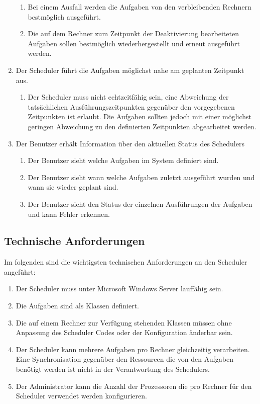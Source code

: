 \begin{enumerate}
\begin{enumerate}
		\item Bei einem Ausfall werden die Aufgaben von den verbleibenden Rechnern bestmöglich ausgeführt.
		\item Die auf dem Rechner zum Zeitpunkt der Deaktivierung bearbeiteten Aufgaben sollen bestmöglich wiederhergestellt und erneut ausgeführt werden.
	\end{enumerate}
	\item Der Scheduler führt die Aufgaben möglichst nahe am geplanten Zeitpunkt aus.
	\begin{enumerate}
		\item Der Scheduler muss nicht echtzeitfähig sein, eine Abweichung der tatsächlichen Ausführungszeitpunkten gegenüber den vorgegebenen Zeitpunkten ist erlaubt. Die Aufgaben sollten jedoch mit einer möglichst geringen Abweichung zu den definierten Zeitpunkten abgearbeitet werden.
	\end{enumerate}
	\item Der Benutzer erhält Information über den aktuellen Status des Schedulers
	\begin{enumerate}
		\item Der Benutzer sieht welche Aufgaben im System definiert sind.
		\item Der Benutzer sieht wann welche Aufgaben zuletzt ausgeführt wurden und wann sie wieder geplant sind.
		\item Der Benutzer sieht den Status der einzelnen Ausführungen der Aufgaben und kann Fehler erkennen.
	\end{enumerate}
\end{enumerate}
\subsection{Technische Anforderungen}
Im folgenden sind die wichtigsten technischen Anforderungen an den Scheduler angeführt:
\begin{enumerate}
	\item Der Scheduler muss unter Microsoft Windows Server lauffähig sein.
	\item Die Aufgaben sind als Klassen definiert.
	\item Die auf einem Rechner zur Verfügung stehenden Klassen müssen ohne Anpassung des Scheduler Codes oder der Konfiguration änderbar sein.
	\item Der Scheduler kann mehrere Aufgaben pro Rechner gleichzeitig verarbeiten. Eine Synchronisation gegenüber den Ressourcen die von den Aufgaben benötigt werden ist nicht in der Verantwortung des Schedulers.
	\item Der Administrator kann die Anzahl der Prozessoren die pro Rechner für den Scheduler verwendet werden konfigurieren.
\end{enumerate}
\chapterend
